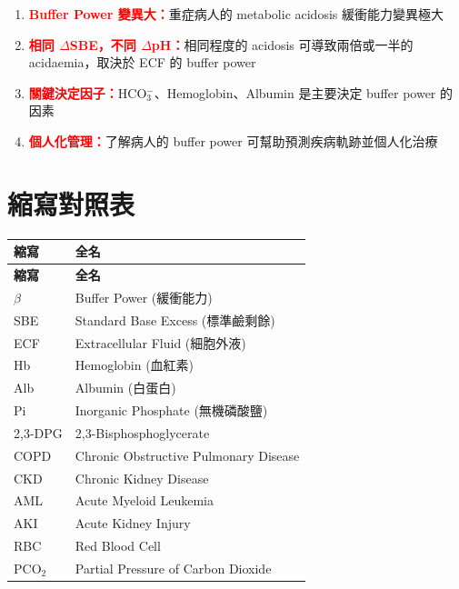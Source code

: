 \documentclass[12pt,a4paper]{article}
\begin{document}
\begin{enumerate}
    \item \textcolor{red}{\textbf{Buffer Power 變異大：}}重症病人的 metabolic acidosis 緩衝能力變異極大
    \item \textcolor{red}{\textbf{相同 $\Delta$SBE，不同 $\Delta$pH：}}相同程度的 acidosis 可導致兩倍或一半的 acidaemia，取決於 ECF 的 buffer power
    \item \textcolor{red}{\textbf{關鍵決定因子：}}HCO$_3^-$、Hemoglobin、Albumin 是主要決定 buffer power 的因素
    \item \textcolor{red}{\textbf{個人化管理：}}了解病人的 buffer power 可幫助預測疾病軌跡並個人化治療
\end{enumerate}

\section{縮寫對照表}

\begin{longtable}{p{3cm}p{11cm}}
\toprule
\textbf{縮寫} & \textbf{全名} \\
\midrule
\endfirsthead

\toprule
\textbf{縮寫} & \textbf{全名} \\
\midrule
\endhead

\bottomrule
\endfoot

$\beta$ & Buffer Power (緩衝能力) \\
SBE & Standard Base Excess (標準鹼剩餘) \\
ECF & Extracellular Fluid (細胞外液) \\
Hb & Hemoglobin (血紅素) \\
Alb & Albumin (白蛋白) \\
Pi & Inorganic Phosphate (無機磷酸鹽) \\
2,3-DPG & 2,3-Bisphosphoglycerate \\
COPD & Chronic Obstructive Pulmonary Disease \\
CKD & Chronic Kidney Disease \\
AML & Acute Myeloid Leukemia \\
AKI & Acute Kidney Injury \\
RBC & Red Blood Cell \\
PCO$_2$ & Partial Pressure of Carbon Dioxide \\
\bottomrule
\end{longtable}
\end{document}
